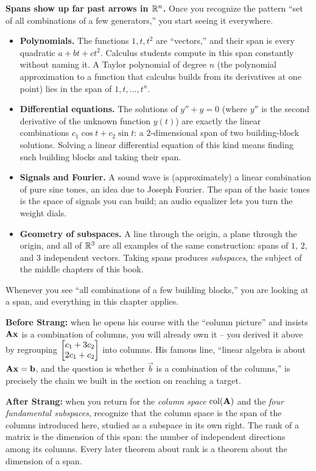 \begin{connectionbox}
\textbf{Spans show up far past arrows in $\mathbb{R}^n$.} Once you recognize the pattern ``set of all combinations of a few generators,'' you start seeing it everywhere.
\begin{itemize}
  \item \textbf{Polynomials.} The functions $1, t, t^2$ are ``vectors,'' and their span is every quadratic $a + bt + ct^2$. Calculus students compute in this span constantly without naming it. A Taylor polynomial of degree $n$ (the polynomial approximation to a function that calculus builds from its derivatives at one point) lies in the span of $1, t, \dots, t^n$.
  \item \textbf{Differential equations.} The solutions of $y'' + y = 0$ (where $y''$ is the second derivative of the unknown function $y(t)$) are exactly the linear combinations $c_1\cos t + c_2\sin t$: a $2$-dimensional span of two building-block solutions. Solving a linear differential equation of this kind means finding such building blocks and taking their span.
  \item \textbf{Signals and Fourier.} A sound wave is (approximately) a linear combination of pure sine tones, an idea due to Joseph Fourier. The span of the basic tones is the space of signals you can build; an audio equalizer lets you turn the weight dials.
  \item \textbf{Geometry of subspaces.} A line through the origin, a plane through the origin, and all of $\mathbb{R}^3$ are all examples of the same construction: spans of $1$, $2$, and $3$ independent vectors. Taking spans produces \emph{subspaces}, the subject of the middle chapters of this book.
\end{itemize}
Whenever you see ``all combinations of a few building blocks,'' you are looking at a span, and everything in this chapter applies.
\end{connectionbox}

\begin{strangbox}
\textbf{Before Strang:} when he opens his course with the ``column picture'' and insists $\mathbf{A}\mathbf{x}$ is a combination of columns, you will already own it -- you derived it above by regrouping $\begin{bmatrix}c_1+3c_2\\2c_1+c_2\end{bmatrix}$ into columns. His famous line, ``linear algebra is about $\mathbf{A}\mathbf{x}=\mathbf{b}$, and the question is whether $\vec{b}$ is a combination of the columns,'' is precisely the chain we built in the section on reaching a target.

\textbf{After Strang:} when you return for the \emph{column space} $\operatorname{col}(\mathbf{A})$ and the \emph{four fundamental subspaces}, recognize that the column space is the span of the columns introduced here, studied as a subspace in its own right. The rank of a matrix is the dimension of this span: the number of independent directions among its columns. Every later theorem about rank is a theorem about the dimension of a span.
\end{strangbox}

